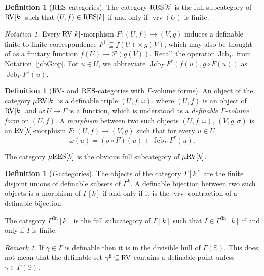\documentclass[12pt]{amsart}
\newcommand{\memph}[1]{{\color{magenta}\emph{#1}}}
\theoremstyle{plain}
\theoremstyle{definition}
\newtheorem{defn}[thm]{Definition}
\theoremstyle{remark}
\newtheorem{rem}[thm]{Remark}
\newtheorem{nota}[thm]{Notation}
\numberwithin{equation}{section}
\theoremstyle{plain}
\newcommand{\RV}{\textup{RV}}
\DeclareMathOperator{\jcb}{Jcb}
\newcommand{\0}{\emptyset}
\newcommand{\mdl}[1]{\mathcal{#1}}  %
\newcommand{\fun}{\longrightarrow}
\newcommand{\sub}{\subseteq}
\newcommand{\mgRV}{{\mu}{\RV}}
\newcommand{\RES}{\textup{RES}}
\newcommand{\mgRES}{{\mu}{\RES}}
\DeclareMathOperator{\fin}{fin}
\DeclareMathOperator{\vrv}{vrv}
\begin{document}
\begin{defn}[$\RES$-categories]\label{defn:RES:cat}
The category $\RES[k]$ is the full subcategory of $\RV[k]$ such that $(U, f) \in \RES[k]$ if and only if $\vrv(U)$ is finite.
\end{defn}

\begin{nota}\label{mor:ftf}
Every $\RV[k]$-morphism $F: (U, f) \fun (V, g)$  induces a definable finite-to-finite correspondence $F^\dag \sub f(U) \times g(V)$, which may also be thought of as a finitary function $f(U) \fun \mdl P(g(V))$. Recall the operator $\jcb_{\Gamma}$ from Notation~\ref{jcbG:op}. For $ u \in U$, we abbreviate $\jcb_{\Gamma}  F^\dag(f(u), g \circ F(u))$ as $\jcb_{\Gamma}  F^\dag(u)$.
\end{nota}


\begin{defn}[$\RV$- and $\RES$-categories with $\Gamma$-volume forms]\label{defn:RV:mu}
An object of the category $\mgRV[k]$ is a definable triple $(U, f, \omega)$, where $(U, f)$ is an object of $\RV[k]$ and $\omega : U \fun \Gamma$ is a function, which is understood as a \memph{definable $\Gamma$-volume form} on $(U, f)$. A \memph{morphism} between two such objects $(U,f, \omega)$, $(V, g, \sigma)$ is an $\RV[k]$-morphism $F: (U, f) \fun (V, g)$ such that for every $ u \in U$,
\begin{equation}\label{cond:mg2}
\omega(u) = (\sigma \circ F)(u) + \jcb_{\Gamma}  F^\dag(u).
\end{equation}

The category $\mgRES[k]$ is the obvious full subcategory of $\mgRV[k]$.
\end{defn}


\begin{defn}[$\Gamma$-categories]\label{def:Ga:cat}
The objects of the category $\Gamma[k]$ are the finite disjoint unions of definable subsets of $\Gamma^k$. A definable bijection between  two such objects is a  morphism of $\Gamma[k]$ if and only if it is the $\vrv$-contraction of a definable bijection.


The category $\Gamma^{\fin}[k]$ is the full subcategory of $\Gamma[k]$ such that $I \in \Gamma^{\fin}[k]$ if and only if $I$ is finite.
\end{defn}

\begin{rem}
If $\gamma \in \Gamma$ is definable then it is in the divisible hull of $\Gamma(\mathbb{S})$. This does not mean that the definable set $\gamma^{\sharp} \sub \RV$ contains a definable point unless $\gamma \in \Gamma(\mathbb{S})$.
\end{rem}
\end{document}
